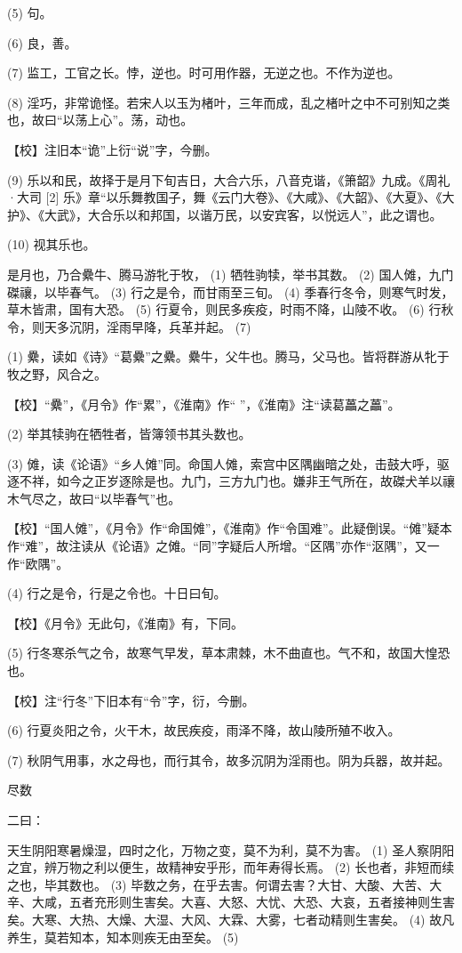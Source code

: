 \documentclass[12pt,UTF8]{ctexbook}
\begin{document}
(5) 句。

(6) 良，善。

(7) 监工，工官之长。悖，逆也。时可用作器，无逆之也。不作为逆也。

(8) 淫巧，非常诡怪。若宋人以玉为楮叶，三年而成，乱之楮叶之中不可别知之类也，故曰“以荡上心”。荡，动也。

【校】注旧本“诡”上衍“说”字，今删。

(9) 乐以和民，故择于是月下旬吉日，大合六乐，八音克谐，《箫韶》九成。《周礼·大司 [2] 乐》章“以乐舞教国子，舞《云门大卷》、《大咸》、《大韶》、《大夏》、《大护》、《大武》，大合乐以和邦国，以谐万民，以安宾客，以悦远人”，此之谓也。

(10) 视其乐也。

是月也，乃合纍牛、腾马游牝于牧， (1) 牺牲驹犊，举书其数。 (2) 国人傩，九门磔禳，以毕春气。 (3) 行之是令，而甘雨至三旬。 (4) 季春行冬令，则寒气时发，草木皆肃，国有大恐。 (5) 行夏令，则民多疾疫，时雨不降，山陵不收。 (6) 行秋令，则天多沉阴，淫雨早降，兵革并起。 (7)

(1) 纍，读如《诗》“葛纍”之纍。纍牛，父牛也。腾马，父马也。皆将群游从牝于牧之野，风合之。

【校】“纍”，《月令》作“累”，《淮南》作“ ”，《淮南》注“读葛藟之藟”。

(2) 举其犊驹在牺牲者，皆簿领书其头数也。

(3) 傩，读《论语》“乡人傩”同。命国人傩，索宫中区隅幽暗之处，击鼓大呼，驱逐不祥，如今之正岁逐除是也。九门，三方九门也。嫌非王气所在，故磔犬羊以禳木气尽之，故曰“以毕春气”也。

【校】“国人傩”，《月令》作“命国傩”，《淮南》作“令国难”。此疑倒误。“傩”疑本作“难”，故注读从《论语》之傩。“同”字疑后人所增。“区隅”亦作“沤隅”，又一作“欧隅”。

(4) 行之是令，行是之令也。十日曰旬。

【校】《月令》无此句，《淮南》有，下同。

(5) 行冬寒杀气之令，故寒气早发，草本肃棘，木不曲直也。气不和，故国大惶恐也。

【校】注“行冬”下旧本有“令”字，衍，今删。

(6) 行夏炎阳之令，火干木，故民疾疫，雨泽不降，故山陵所殖不收入。

(7) 秋阴气用事，水之母也，而行其令，故多沉阴为淫雨也。阴为兵器，故并起。





尽数


二曰：

天生阴阳寒暑燥湿，四时之化，万物之变，莫不为利，莫不为害。 (1) 圣人察阴阳之宜，辨万物之利以便生，故精神安乎形，而年寿得长焉。 (2) 长也者，非短而续之也，毕其数也。 (3) 毕数之务，在乎去害。何谓去害？大甘、大酸、大苦、大辛、大咸，五者充形则生害矣。大喜、大怒、大忧、大恐、大哀，五者接神则生害矣。大寒、大热、大燥、大湿、大风、大霖、大雾，七者动精则生害矣。 (4) 故凡养生，莫若知本，知本则疾无由至矣。 (5)
\end{document}

